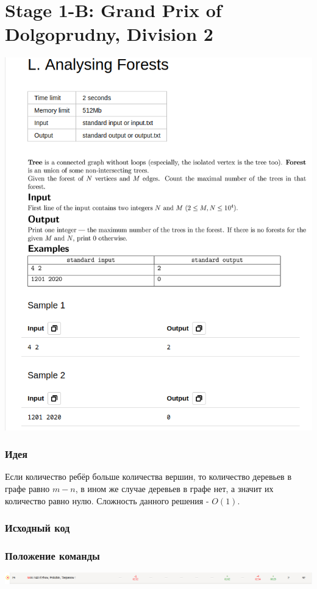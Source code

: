 \documentclass[12pt]{article}
\begin{document}
\section{Stage 1-B: Grand Prix of Dolgoprudny, Division 2}
\includegraphics[scale=0.75]{statements/1_L.png}
\subsubsection*{Идея}
Если количество ребёр больше количества вершин, то количество деревьев в графе равно $m-n$,
в ином же случае деревьев в графе нет, а значит их количество равно нулю.
Сложность данного решения - $O(1)$.

\subsubsection*{Исходный код}

\subsubsection*{Положение команды}
\includegraphics[scale=0.45]{images/1.png}\newline\noindent
\end{document}
